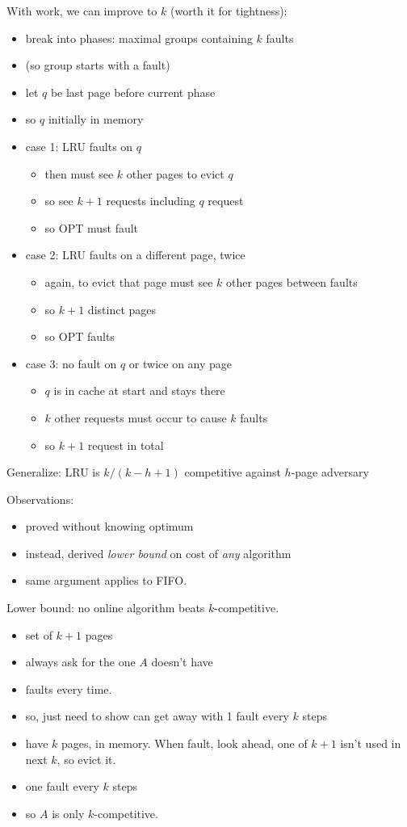 \documentclass{article}
\begin{document}
With work, we can improve to $k$ (worth it for tightness):
\begin{itemize}
\item break into phases: maximal groups containing $k$ faults
\item (so group starts with a fault)
\item let $q$ be last page before current phase
\item so $q$ initially in memory
\item case 1: LRU faults on $q$
\begin{itemize}
\item then must see $k$ other pages to evict $q$
\item so see $k+1$ requests including $q$ request
\item so OPT must fault
\end{itemize}
\item case 2: LRU faults on a different page, twice
\begin{itemize}
\item again, to evict that page must see $k$ other pages between
  faults
\item so $k+1$ distinct pages
\item so OPT faults
\end{itemize}
\item case 3: no fault on $q$ or twice on any page
\begin{itemize}
\item $q$ is in cache at start and stays there
\item $k$ other requests must occur to cause $k$ faults
\item so $k+1$ request in total
\end{itemize}
\end{itemize}
Generalize: LRU is $k/(k-h+1)$ competitive against $h$-page adversary

Observations:
\begin{itemize}
\item proved without knowing optimum
\item instead, derived \emph{lower bound} on cost of \emph{any}
  algorithm
\item same argument applies to FIFO.
\end{itemize}

Lower bound: no online algorithm beats $k$-competitive.
\begin{itemize}
\item set of $k+1$ pages
\item always ask for the one $A$ doesn't have
\item faults every time.
\item so, just need to show can get away with 1 fault every $k$ steps
\item have $k$ pages, in memory.  When fault, look ahead, one of $k+1$
  isn't used in next $k$, so evict it.
\item one fault every $k$ steps
\item so $A$ is only $k$-competitive.
\end{itemize}
\end{document}
